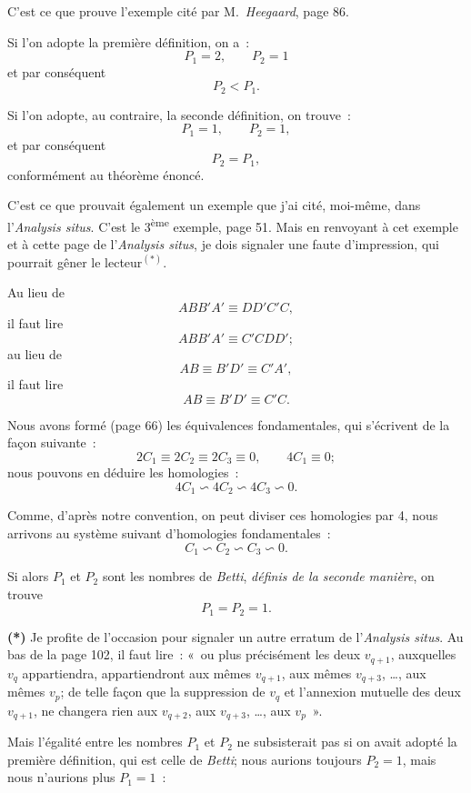 \documentclass{article}
\begin{document}
C'est ce que prouve l'exemple cité par M.~\emph{Heegaard}, page 86.

Si l'on adopte la première définition, on a~:
\[ P_{1} = 2, \qquad P_{2} = 1 \]
et par conséquent
\[ P_{2} < P_{1}. \]

Si l'on adopte, au contraire, la seconde définition, on trouve~:
\[ P_{1} = 1, \qquad P_{2} = 1, \]
et par conséquent
\[ P_{2} = P_{1}, \]
conformément au théorème énoncé.


C'est ce que prouvait également un exemple que j'ai cité, moi-même, dans l'\emph{Analysis situs}. C'est le 3\textsuperscript{ème} exemple, page 51. Mais en renvoyant à cet exemple et à cette page de l'\emph{Analysis situs}, je dois signaler une faute d'impression, qui pourrait gêner le lecteur${}^{(*)}$.

Au lieu de
\[ ABB'A' \equiv DD'C'C, \]
il faut lire
\[ ABB'A' \equiv C'CDD'; \]
au lieu de
\[ AB \equiv B'D' \equiv C'A', \]
il faut lire
\[ AB \equiv B'D' \equiv C'C. \]

Nous avons formé (page 66) les équivalences fondamentales, qui s'écrivent de la façon suivante~:
\[ 2C_{1} \equiv 2C_{2} \equiv 2C_{3} \equiv 0, \qquad 4C_{1} \equiv 0; \]
nous pouvons en déduire les homologies~:
\[ 4C_{1} \backsim 4C_{2} \backsim 4C_{3} \backsim 0. \]

Comme, d'après notre convention, on peut diviser ces homologies par 4, nous arrivons au système suivant d'homologies fondamentales~:
\[ C_{1} \backsim C_{2} \backsim C_{3} \backsim 0. \]

Si alors $P_{1}$ et $P_{2}$ sont les nombres de \emph{Betti}, \emph{définis de la seconde manière}, on trouve
\[ P_{1} = P_{2} = 1. \]

\textbf{(*)} Je profite de l'occasion pour signaler un autre erratum de l'\emph{Analysis situs}. Au bas de la page 102, il faut lire~: «~ou plus précisément les deux $v_{q+1}$, auxquelles $v_{q}$ appartiendra, appartiendront aux mêmes $v_{q+1}$, aux mêmes $v_{q+3}$, \ldots, aux mêmes $v_{p}$; de telle façon que la suppression de $v_{q}$ et l'annexion mutuelle des deux $v_{q+1}$, ne changera rien aux $v_{q+2}$, aux $v_{q+3}$, \ldots, aux $v_{p}$~».


Mais l'égalité entre les nombres $P_{1}$ et $P_{2}$ ne subsisterait pas si on avait adopté la première définition, qui est celle de \emph{Betti}; nous aurions toujours $P_{2} = 1$, mais nous n'aurions plus $P_{1} = 1$~:
\end{document}
